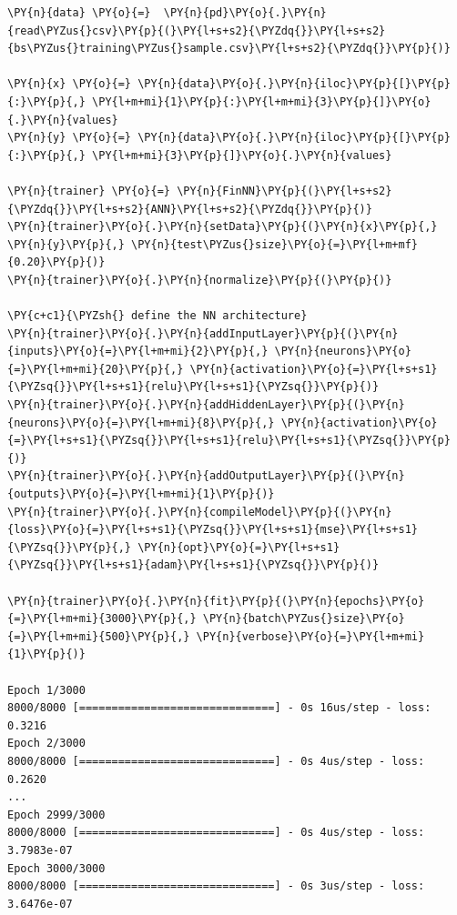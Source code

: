\begin{tcolorbox}[breakable, size=fbox, boxrule=1pt, pad at break*=1mm,colback=cellbackground, colframe=cellborder]
\begin{Verbatim}[commandchars=\\\{\}]
\PY{n}{data} \PY{o}{=}  \PY{n}{pd}\PY{o}{.}\PY{n}{read\PYZus{}csv}\PY{p}{(}\PY{l+s+s2}{\PYZdq{}}\PY{l+s+s2}{bs\PYZus{}training\PYZus{}sample.csv}\PY{l+s+s2}{\PYZdq{}}\PY{p}{)}
	
\PY{n}{x} \PY{o}{=} \PY{n}{data}\PY{o}{.}\PY{n}{iloc}\PY{p}{[}\PY{p}{:}\PY{p}{,} \PY{l+m+mi}{1}\PY{p}{:}\PY{l+m+mi}{3}\PY{p}{]}\PY{o}{.}\PY{n}{values}
\PY{n}{y} \PY{o}{=} \PY{n}{data}\PY{o}{.}\PY{n}{iloc}\PY{p}{[}\PY{p}{:}\PY{p}{,} \PY{l+m+mi}{3}\PY{p}{]}\PY{o}{.}\PY{n}{values}

\PY{n}{trainer} \PY{o}{=} \PY{n}{FinNN}\PY{p}{(}\PY{l+s+s2}{\PYZdq{}}\PY{l+s+s2}{ANN}\PY{l+s+s2}{\PYZdq{}}\PY{p}{)}
\PY{n}{trainer}\PY{o}{.}\PY{n}{setData}\PY{p}{(}\PY{n}{x}\PY{p}{,} \PY{n}{y}\PY{p}{,} \PY{n}{test\PYZus{}size}\PY{o}{=}\PY{l+m+mf}{0.20}\PY{p}{)}
\PY{n}{trainer}\PY{o}{.}\PY{n}{normalize}\PY{p}{(}\PY{p}{)}
	
\PY{c+c1}{\PYZsh{} define the NN architecture}
\PY{n}{trainer}\PY{o}{.}\PY{n}{addInputLayer}\PY{p}{(}\PY{n}{inputs}\PY{o}{=}\PY{l+m+mi}{2}\PY{p}{,} \PY{n}{neurons}\PY{o}{=}\PY{l+m+mi}{20}\PY{p}{,} \PY{n}{activation}\PY{o}{=}\PY{l+s+s1}{\PYZsq{}}\PY{l+s+s1}{relu}\PY{l+s+s1}{\PYZsq{}}\PY{p}{)}
\PY{n}{trainer}\PY{o}{.}\PY{n}{addHiddenLayer}\PY{p}{(}\PY{n}{neurons}\PY{o}{=}\PY{l+m+mi}{8}\PY{p}{,} \PY{n}{activation}\PY{o}{=}\PY{l+s+s1}{\PYZsq{}}\PY{l+s+s1}{relu}\PY{l+s+s1}{\PYZsq{}}\PY{p}{)}
\PY{n}{trainer}\PY{o}{.}\PY{n}{addOutputLayer}\PY{p}{(}\PY{n}{outputs}\PY{o}{=}\PY{l+m+mi}{1}\PY{p}{)}
\PY{n}{trainer}\PY{o}{.}\PY{n}{compileModel}\PY{p}{(}\PY{n}{loss}\PY{o}{=}\PY{l+s+s1}{\PYZsq{}}\PY{l+s+s1}{mse}\PY{l+s+s1}{\PYZsq{}}\PY{p}{,} \PY{n}{opt}\PY{o}{=}\PY{l+s+s1}{\PYZsq{}}\PY{l+s+s1}{adam}\PY{l+s+s1}{\PYZsq{}}\PY{p}{)}
	
\PY{n}{trainer}\PY{o}{.}\PY{n}{fit}\PY{p}{(}\PY{n}{epochs}\PY{o}{=}\PY{l+m+mi}{3000}\PY{p}{,} \PY{n}{batch\PYZus{}size}\PY{o}{=}\PY{l+m+mi}{500}\PY{p}{,} \PY{n}{verbose}\PY{o}{=}\PY{l+m+mi}{1}\PY{p}{)}

Epoch 1/3000
8000/8000 [==============================] - 0s 16us/step - loss: 0.3216
Epoch 2/3000
8000/8000 [==============================] - 0s 4us/step - loss: 0.2620
...
Epoch 2999/3000
8000/8000 [==============================] - 0s 4us/step - loss: 3.7983e-07
Epoch 3000/3000
8000/8000 [==============================] - 0s 3us/step - loss: 3.6476e-07


\end{Verbatim}
\end{tcolorbox}
